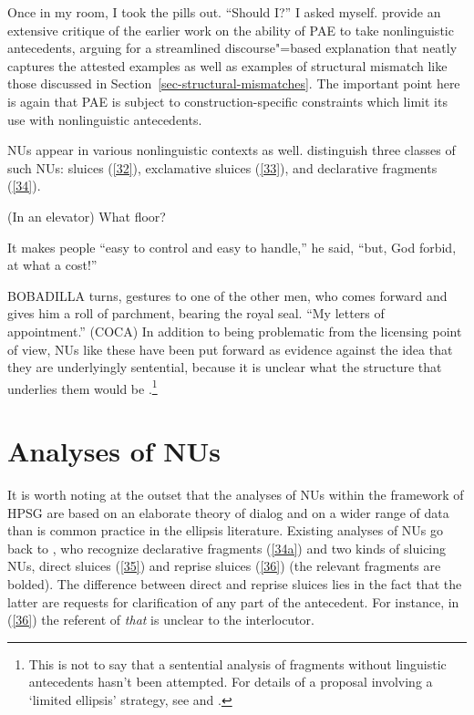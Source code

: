 \documentclass[output=paper
	        ,collection
	        ,collectionchapter
 	        ,biblatex
                ,babelshorthands
                ,newtxmath
                ,draftmode
                ,colorlinks, citecolor=brown
]{langscibook}
\begin{document}
{\ea Once in my room, I took the pills out. ``Should I?'' I asked myself. \citep[ex. 22a][]{Miller2014b}\label{31}\z
\citet{Miller2014b} provide an extensive critique of the earlier work on the ability of PAE to take nonlinguistic antecedents, arguing for a streamlined discourse"=based explanation that neatly captures the attested examples as well as examples of structural mismatch like those discussed in Section~\ref{sec-structural-mismatches}. The important point here is again that PAE is subject to construction-specific constraints which limit its use with nonlinguistic antecedents.

NUs appear in various nonlinguistic contexts as well. \citet{Ginzburg2018} distinguish three classes of such NUs: sluices (\ref{32}), exclamative sluices (\ref{33}), and declarative fragments (\ref{34}).

\ea (In an elevator) What floor? \citep[298]{Ginzburg:Sag:2000}\label{32}\z

\ea It makes people ``easy to control and easy to handle,'' he said, ``but, God forbid, at what a cost!''
\label{33}\z

\ea BOBADILLA turns, gestures to one of the other men, who comes forward and gives him a roll of parchment, bearing the royal seal. ``My letters of appointment.'' (COCA)\label{34}\z
In addition to being problematic from the licensing point of view, NUs like these have been put forward as evidence against the idea that they are underlyingly sentential, because it is unclear what the structure that underlies them would be \citep[see][]{Ginzburg:Sag:2000, CJ2005a, Stainton2006}.\footnote{This is not to say that a sentential analysis of fragments without linguistic antecedents hasn't been attempted. For details of a proposal involving a `limited ellipsis' strategy, see \citet{Merchant2005a} and \citet{Merchant2010}.}


\section{Analyses of NUs}
\label{sec-analyses-of-NUs}

It is worth noting at the outset that the analyses of NUs within the framework of HPSG are based on an elaborate theory of dialog \citep{Ginzburg1994, Ginzburg2004, Ginzburg2014a, Larsson2002, Purver2006, Fernandez2006, Fernandez2002, Fernandez2007, Ginzburg2010, Ginzburg2014b, Ginzburg2012, Ginzburg2013, Kim2019} and on a wider range of data than is common practice in the ellipsis literature. Existing analyses of NUs go back to \citet{Ginzburg:Sag:2000}, who recognize declarative fragments (\ref{34a}) and two kinds of sluicing NUs, direct sluices (\ref{35}) and reprise sluices (\ref{36}) (the relevant fragments are bolded). The difference between direct and reprise sluices lies in the fact that the latter are requests for clarification of any part of the antecedent. For instance, in (\ref{36}) the referent of \textit{that} is unclear to the interlocutor.

}
\end{document}
